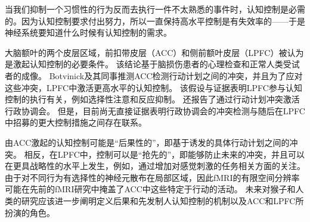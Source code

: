 当我们抑制一个习惯性的行为反而去执行一件不太熟悉的事件时，认知控制是必需的。因为认知控制要求付出努力，所以一直保持高水平控制是有失效率的——于是神经系统要知道什么时候有认知控制的需求。

大脑额叶的两个皮层区域，前扣带皮层（ACC）和侧前额叶皮层（LPFC）被认为是激起认知控制的必要条件。 该结论基于脑损伤患者的心理检查和正常人类受试者的成像。 Botvinick及其同事推测ACC检测行动计划之间的冲突，并且为了应对这些冲突，LPFC中激活更高水平的认知控制。 该假设与证据表明LPFC参与认知控制的执行有关，例如选择性注意和反应抑制。 还报告了通过行动计划冲突激活行政协调会。 但是，目前尚无直接证据表明行政协调会的冲突检测与随后在LPFC中招募的更大控制措施之间存在联系。

由ACC激起的认知控制可能是“后果性的”，即基于诱发的具体行动计划之间的冲突。 相反，在LPFC中，控制可以是“抢先的”，即能够防止未来的冲突，并且可以在更具战略性的水平上发生，例如，通过增加对感觉刺激的任务相关方面的关注。 由于对不同行为有选择性的神经元散布在局部区域，因此fMRI的有限空间分辨率可能在先前的fMRI研究中掩盖了ACC中这些特定于行动的活动。 未来对猴子和人类的研究应该进一步阐明定义后果和先发制人认知控制的机制以及ACC和LPFC所扮演的角色。

